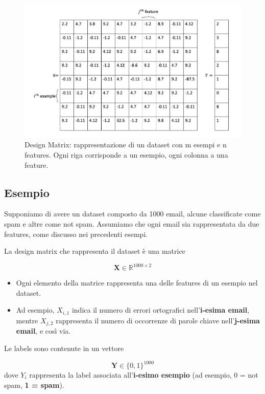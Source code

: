 \begin{figure}[htbp]
    \centering
    \includegraphics[width=\textwidth]{images/designMatrix.jpg}
    \caption{Design Matrix: rappresentazione di un dataset con m esempi e n features. Ogni riga corrisponde a un esempio, ogni colonna a una feature.}
    \label{fig:designMatrix}
\end{figure}

\subsection{Esempio}

Supponiamo di avere un dataset composto da 1000 email, alcune classificate come spam e altre come not spam. Assumiamo che ogni email sia rappresentata da due features, come discusso nei precedenti esempi.

\noindent
La design matrix che rappresenta il dataset è una matrice

$$ \mathbf{X} \in \mathbb{R}^{1000 \times 2} $$

\begin{itemize}
\item Ogni elemento della matrice rappresenta una delle features di un esempio nel dataset.
\item Ad esempio, $ {X}_{i,1} $ indica il numero di errori ortografici nell’\textbf{i-esima email}, mentre $ {X}_{j,2} $ rappresenta il numero di occorrenze di parole chiave nell’\textbf{j-esima email}, e così via.
\end{itemize}

\noindent
Le labels sono contenute in un vettore

$$ \mathbf{Y} \in \{0,1\}^{1000} $$
dove $ Y_i $ rappresenta la label associata all’\textbf{i-esimo esempio} (ad esempio, 0 = not spam, \textbf{1 = spam}).

